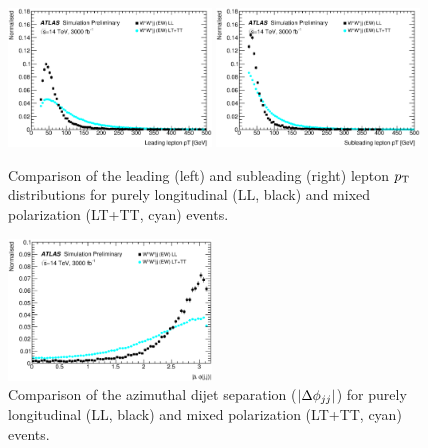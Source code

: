 \begin{figure}[htp]
  \centering
  \includegraphics[width=0.48\textwidth]{figs/ssww_upgrade/polarization/lepton0_pt_pass9}
  \includegraphics[width=0.48\textwidth]{figs/ssww_upgrade/polarization/lepton1_pt_pass9}
  \caption{Comparison of the leading (left) and subleading (right) lepton $p_{\mathrm{T}}$ distributions for purely longitudinal (LL, black) and mixed polarization (LT+TT, cyan) \ssww events.}
  \label{fig:polarization_leppt}
\end{figure}

\begin{figure}[htp]
  \centering
  \includegraphics[width=0.48\textwidth]{figs/ssww_upgrade/polarization/dijet_absdphijj_pass9}
  \caption{Comparison of the azimuthal dijet separation ($|\Delta\phi_{jj}|$) for purely longitudinal (LL, black) and mixed polarization (LT+TT, cyan) \ssww events.}
  \label{fig:polarization_dphijj}
\end{figure}
